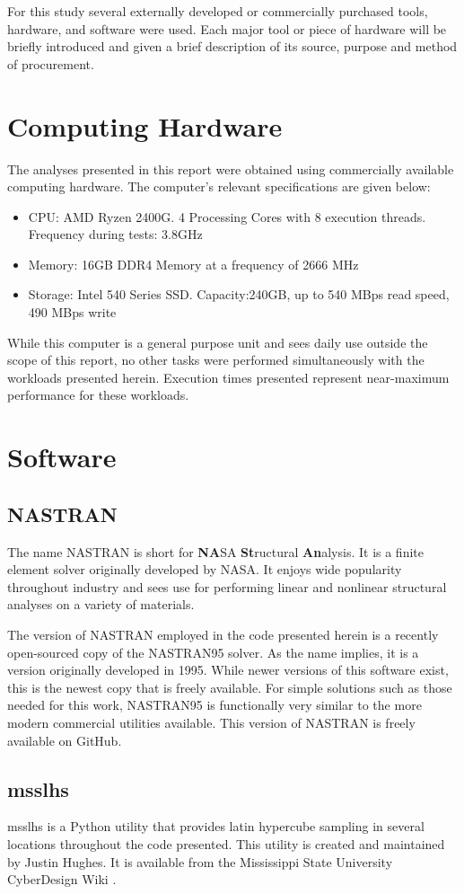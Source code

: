 For this study several externally developed or commercially purchased tools, hardware, and software were used. Each major tool or piece of hardware will be briefly introduced and given a brief description of its source, purpose and method of procurement.

\section{Computing Hardware}
The analyses presented in this report were obtained using commercially available computing hardware. The computer's relevant specifications are given below: 

\begin{itemize}
\item CPU: AMD Ryzen 2400G. 4 Processing Cores with 8 execution threads. Frequency during tests: 3.8GHz
\item Memory: 16GB DDR4 Memory at a frequency of 2666 MHz
\item Storage: Intel 540 Series SSD. Capacity:240GB, up to 540 MBps read speed, 490 MBps write
\end{itemize}

While this computer is a general purpose unit and sees daily use outside the scope of this report, no other tasks were performed simultaneously with the workloads presented herein. Execution times presented represent near-maximum performance for these workloads. 

\section{Software}
\subsection{NASTRAN}
The name NASTRAN is short for \textbf{NA}SA \textbf{St}ructural \textbf{An}alysis. It is a finite element solver originally developed by NASA. It enjoys wide popularity throughout industry and sees use for performing linear and nonlinear structural analyses on a variety of materials. 

The version of NASTRAN employed in the code presented herein is a recently open-sourced copy of the NASTRAN95 solver. As the name implies, it is a version originally developed in 1995. While newer versions of this software exist, this is the newest copy that is freely available. For simple solutions such as those needed for this work, NASTRAN95 is functionally very similar to the more modern commercial utilities available. This version of NASTRAN is freely available on GitHub.  

\subsection{msslhs}

msslhs is a Python utility that provides latin hypercube sampling in several locations throughout the code presented. This utility is created and maintained by Justin Hughes. It is available from the Mississippi State University CyberDesign Wiki \cite{msslhs}. 
